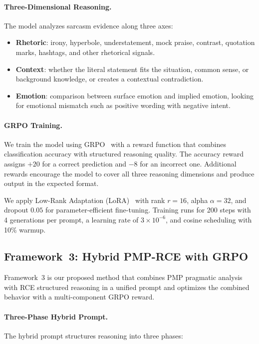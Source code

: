 \documentclass{article}
\begin{document}
\paragraph{Three-Dimensional Reasoning.}
The model analyzes sarcasm evidence along three axes:
\begin{itemize}[leftmargin=*, itemsep=0pt]
    \item \textbf{Rhetoric}: irony, hyperbole, understatement, mock praise, contrast, quotation marks, hashtags, and other rhetorical signals.
    \item \textbf{Context}: whether the literal statement fits the situation, common sense, or background knowledge, or creates a contextual contradiction.
    \item \textbf{Emotion}: comparison between surface emotion and implied emotion, looking for emotional mismatch such as positive wording with negative intent.
\end{itemize}

\paragraph{GRPO Training.}
We train the model using GRPO~\citep{deepseekr1} with a reward function that combines classification accuracy with structured reasoning quality. The accuracy reward assigns $+20$ for a correct prediction and $-8$ for an incorrect one. Additional rewards encourage the model to cover all three reasoning dimensions and produce output in the expected format.

We apply Low-Rank Adaptation (LoRA)~\citep{lora} with rank $r=16$, alpha $\alpha=32$, and dropout $0.05$ for parameter-efficient fine-tuning. Training runs for 200 steps with 4 generations per prompt, a learning rate of $3 \times 10^{-6}$, and cosine scheduling with 10\% warmup.

\subsection{Framework~3: Hybrid PMP-RCE with GRPO}

Framework~3 is our proposed method that combines PMP pragmatic analysis with RCE structured reasoning in a unified prompt and optimizes the combined behavior with a multi-component GRPO reward.

\paragraph{Three-Phase Hybrid Prompt.}
The hybrid prompt structures reasoning into three phases:
\end{document}
